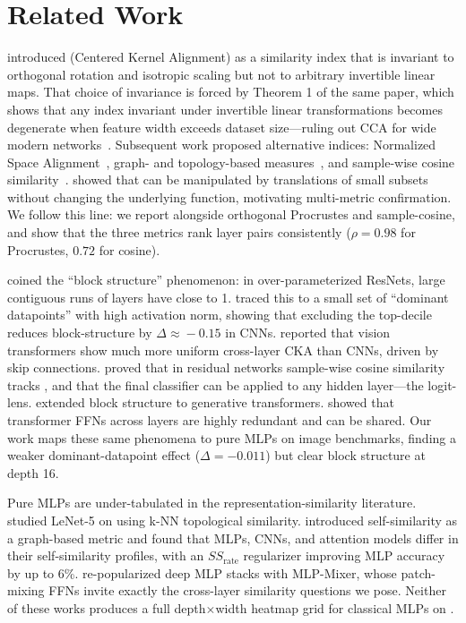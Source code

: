\section{Related Work}
\label{sec:related}

 \citet{kornblith2019similarity} introduced \ckam (Centered Kernel Alignment) as a similarity index that is invariant to orthogonal rotation and isotropic scaling but not to arbitrary invertible linear maps. That choice of invariance is forced by Theorem 1 of the same paper, which shows that any index invariant under invertible linear transformations becomes degenerate when feature width exceeds dataset size---ruling out CCA for wide modern networks~\citep{raghu2017svcca}. Subsequent work proposed alternative indices: Normalized Space Alignment~\citep{ebadulla2024nsa}, graph- and topology-based measures~\citep{hryniowski2020nnts}, and sample-wise cosine similarity~\citep{jiang2024tracing}. \citet{davari2022reliability} showed that \ckam can be manipulated by translations of small subsets without changing the underlying function, motivating multi-metric confirmation. We follow this line: we report \ckam alongside orthogonal Procrustes and sample-cosine, and show that the three metrics rank layer pairs consistently ($\rho = 0.98$ for Procrustes, $0.72$ for cosine).

 \citet{nguyen2021wide} coined the ``block structure'' phenomenon: in over-parameterized ResNets, large contiguous runs of layers have \ckam close to 1. \citet{nguyen2022origins} traced this to a small set of ``dominant datapoints'' with high activation norm, showing that excluding the top-decile reduces block-structure \ckam by $\Delta \approx\!-0.15$ in CNNs. \citet{raghu2021vit} reported that vision transformers show much more uniform cross-layer CKA than CNNs, driven by skip connections. \citet{jiang2024tracing} proved that in residual networks sample-wise cosine similarity tracks \ckam, and that the final classifier can be applied to any hidden layer---the logit-lens. \citet{brown2023dissimilarity} extended block structure to generative transformers. \citet{pessoa2023onewide} showed that transformer FFNs across layers are highly redundant and can be shared. Our work maps these same phenomena to pure MLPs on image benchmarks, finding a weaker dominant-datapoint effect ($\Delta = -0.011$) but clear block structure at depth 16.

 Pure MLPs are under-tabulated in the representation-similarity literature. \citet{hryniowski2020nnts} studied LeNet-5 on \mnist using k-NN topological similarity. \citet{ding2025selfsimilarity} introduced self-similarity as a graph-based metric and found that MLPs, CNNs, and attention models differ in their self-similarity profiles, with an $SS_{\mathrm{rate}}$ regularizer improving MLP accuracy by up to 6\%. \citet{tolstikhin2021mlpmixer} re-popularized deep MLP stacks with MLP-Mixer, whose patch-mixing FFNs invite exactly the cross-layer similarity questions we pose. Neither of these works produces a full depth$\times$width heatmap grid for classical MLPs on \cifar.

